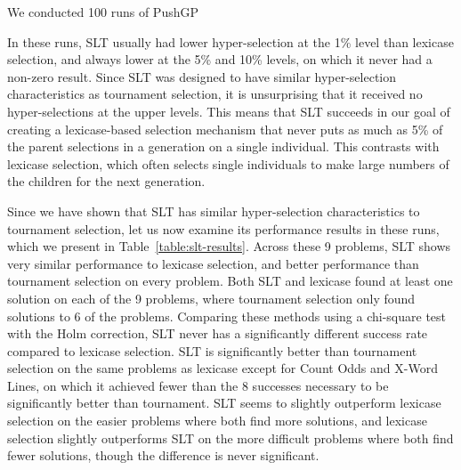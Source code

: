 \documentclass{sig-alternate-05-2015}
\begin{document}
We conducted 100 runs of PushGP%

In these runs, SLT usually had lower hyper-selection at the 1\% level than lexicase selection, and always lower at the 5\% and 10\% levels, on which it never had a non-zero result. Since SLT was designed to have similar hyper-selection characteristics as tournament selection, it is unsurprising that it received no hyper-selections at the upper levels. This means that SLT succeeds in our goal of creating a lexicase-based selection mechanism that never puts as much as 5\% of the parent selections in a generation on a single individual. This contrasts with lexicase selection, which often selects single individuals to make large numbers of the children for the next generation.

Since we have shown that SLT has similar hyper-selection characteristics to tournament selection, let us now examine its performance results in these runs, which we present in Table~\ref{table:slt-results}. Across these 9 problems, SLT shows very similar performance to lexicase selection, and better performance than tournament selection on every problem. Both SLT and lexicase found at least one solution on each of the 9 problems, where tournament selection only found solutions to 6 of the problems. Comparing these methods using a chi-square test with the Holm correction, SLT never has a significantly different success rate compared to lexicase selection. SLT is significantly better than tournament selection on the same problems as lexicase except for Count Odds and X-Word Lines, on which it achieved fewer than the 8 successes necessary to be significantly better than tournament.
 SLT seems to slightly outperform lexicase selection on the easier problems where both find more solutions, and lexicase selection slightly outperforms SLT on the more difficult problems where both find fewer solutions, though the difference is never significant.
\end{document}
